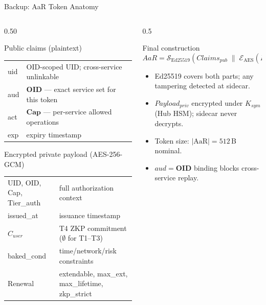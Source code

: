 \documentclass[aspectratio=169,11pt]{beamer}
\begin{document}
{%
\begin{frame}[noframenumbering]{Backup: AaR Token Anatomy}
\vspace{-6pt}
\begin{columns}[T,onlytextwidth]
\begin{column}{0.50\textwidth}
\begin{callout}{Public claims (plaintext)}
\tiny
\setlength{\tabcolsep}{3pt}
\renewcommand{\arraystretch}{1.05}
\begin{tabular}{>{\ttfamily}l p{3.6cm}}
uid   & OID-scoped UID; cross-service unlinkable \\
aud   & $\mathbf{OID}$ — exact service set for this token \\
act   & $\mathbf{Cap}$ — per-service allowed operations \\
exp   & expiry timestamp \\
\end{tabular}
\end{callout}
\vspace{1.5pt}
\begin{callout}{Encrypted private payload (AES-256-GCM)}
\tiny
\setlength{\tabcolsep}{3pt}
\renewcommand{\arraystretch}{1.05}
\begin{tabular}{>{\ttfamily}l p{3.6cm}}
UID, OID, Cap, Tier\_auth & full authorization context \\
issued\_at     & issuance timestamp \\
$C_{user}$     & T4 ZKP commitment ($\emptyset$ for T1--T3) \\
baked\_cond    & time/network/risk constraints \\
Renewal        & extendable, max\_ext, max\_lifetime, zkp\_strict \\
\end{tabular}
\end{callout}
\end{column}
\begin{column}{0.5\textwidth}
\begin{callout}{Final construction}
\scriptsize
\[
AaR = \mathcal{S}_{\mathrm{Ed25519}}\!\left(
  Claims_{pub} \;\|\; \mathcal{E}_{\mathrm{AES}}\!(K_{sym}, Payload_{priv})
\right)
\]

\begin{itemize}
  \setlength{\topsep}{1pt}\setlength{\itemsep}{2pt}\setlength{\parsep}{0pt}
  \scriptsize
  \item Ed25519 covers both parts; any tampering detected at sidecar.
  \item $Payload_{priv}$ encrypted under $K_{sym}$ (Hub HSM); sidecar never decrypts.
  \item Token size: $|\mathrm{AaR}| = 512$\,B nominal.
  \item $aud = \mathbf{OID}$ binding blocks cross-service replay.
\end{itemize}
\end{callout}
\end{column}
\end{columns}
\end{frame}

}
\end{document}
